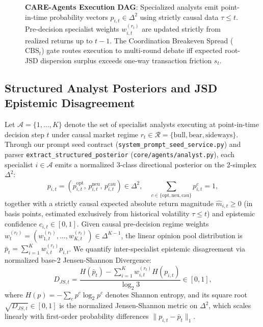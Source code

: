 \documentclass[10pt,a4paper,twocolumn]{article}
\begin{document}
\begin{figure}[t]
{\begin{tikzpicture}
\end{tikzpicture}%
}
\caption{\textbf{CARE-Agents Execution DAG}: Specialized analysts emit point-in-time probability vectors $p_{i,t} \in \Delta^2$ using strictly causal data $\tau \le t$. Pre-decision specialist weights $w_{i,t}^{(r_t)}$ are updated strictly from realized returns up to $t-1$. The Coordination Breakeven Spread ($\text{CBS}_t$) gate routes execution to multi-round debate iff expected root-JSD dispersion surplus exceeds one-way transaction friction $s_t$.}
\label{fig:care_agents_architecture}
\end{figure}

\subsection{Structured Analyst Posteriors and JSD Epistemic Disagreement}

Let $\mathcal{A} = \{1, \dots, K\}$ denote the set of specialist analysts executing at point-in-time decision step $t$ under causal market regime $r_t \in \mathcal{R} = \{\text{bull}, \text{bear}, \text{sideways}\}$. Through our prompt seed contract (\texttt{system\_prompt\_seed\_service.py}) and parser \texttt{extract\_structured\_posterior} (\texttt{core/agents/analyst.py}), each specialist $i \in \mathcal{A}$ emits a normalized 3-class directional posterior on the 2-simplex $\Delta^2$:
\begin{equation}
  p_{i,t} = \left(p_{i,t}^{\text{opt}}, \, p_{i,t}^{\text{neu}}, \, p_{i,t}^{\text{cau}}\right) \in \Delta^2, \quad \sum_{c \in \{\text{opt},\text{neu},\text{cau}\}} p_{i,t}^c = 1,
\end{equation}
together with a strictly causal expected absolute return magnitude $\hat{m}_{i,t} \ge 0$ (in basis points, estimated exclusively from historical volatility $\tau \le t$) and epistemic confidence $c_{i,t} \in [0, 1]$. Given causal pre-decision regime weights $w_t^{(r_t)} = (w_{1,t}^{(r_t)}, \dots, w_{K,t}^{(r_t)}) \in \Delta^{K-1}$, the linear opinion pool distribution is $\bar{p}_t = \sum_{i=1}^K w_{i,t}^{(r_t)} p_{i,t}$. We quantify inter-specialist epistemic disagreement via normalized base-2 Jensen-Shannon Divergence:
\begin{equation}
  D_{JS,t} = \frac{H(\bar{p}_t) - \sum_{i=1}^K w_{i,t}^{(r_t)} H(p_{i,t})}{\log_2 3} \in [0, 1],
  \label{eq:jsd}
\end{equation}
where $H(p) = -\sum_{c} p^c \log_2 p^c$ denotes Shannon entropy, and its square root $\sqrt{D_{JS,t}} \in [0, 1]$ is the normalized Jensen-Shannon metric on $\Delta^2$, which scales linearly with first-order probability differences $\|p_{i,t} - \bar{p}_t\|_1$.
\end{document}
